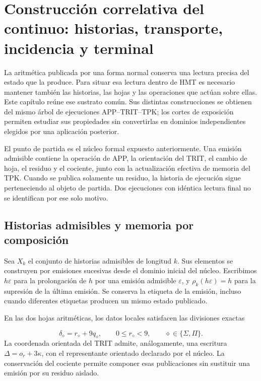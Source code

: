 \section{Construcción correlativa del continuo: historias, transporte, incidencia y terminal}
\label{x_reciprocidad:iv:continuo-conjunto}
La aritmética publicada por una forma normal conserva una lectura precisa del estado que la produce. Para situar esa lectura dentro de HMT es necesario mantener también las historias, las hojas y las operaciones que actúan sobre ellas. Este capítulo reúne ese sustrato común. Sus distintas construcciones se obtienen del mismo árbol de ejecuciones APP–TRIT–TPK; los cortes de exposición permiten estudiar sus propiedades sin convertirlas en dominios independientes elegidos por una aplicación posterior.

El punto de partida es el núcleo formal expuesto anteriormente. Una emisión admisible contiene la operación de APP, la orientación del TRIT, el cambio de hoja, el residuo y el cociente, junto con la actualización efectiva de memoria del TPK. Cuando se publica solamente un residuo, la historia de ejecución sigue perteneciendo al objeto de partida. Dos ejecuciones con idéntica lectura final no se identifican por ese solo motivo.

\subsection{Historias admisibles y memoria por composición}
\label{x_reciprocidad:iv:cont:historias}
Sea \(X_k\) el conjunto de historias admisibles de longitud \(k\). Sus elementos se construyen por emisiones sucesivas desde el dominio inicial del núcleo. Escribimos \(h\varepsilon\) para la prolongación de \(h\) por una emisión admisible \(\varepsilon\), y \(\rho_k(h\varepsilon)=h\) para la supresión de la última emisión. Se conserva la etiqueta de la emisión, incluso cuando diferentes etiquetas producen un mismo estado publicado.

En las dos hojas aritméticas, los datos locales satisfacen las divisiones exactas

\[
\delta_\diamond=r_\diamond+9q_\diamond,
\qquad 0\leq r_\diamond<9,
\qquad \diamond\in\{\Sigma,\Pi\}.
\]
La coordenada orientada del TRIT admite, análogamente, una escritura \(\Delta=o_r+3\kappa\), con el representante orientado declarado por el núcleo. La conservación del cociente permite componer esas publicaciones sin sustituir una emisión por su residuo aislado.

